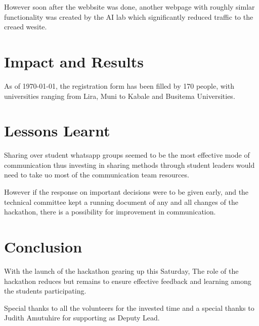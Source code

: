 \documentclass[a4paper,12pt]{report}
\begin{document}
    However soon after the webbsite was done, another webpage with roughly simlar functionality was created by the AI lab which significantly reduced traffic to the creaed wesite.

    \section{Impact and Results}
    As of \today , the registration form has been filled by 170 people, with universities ranging from Lira, Muni to Kabale and Busitema Universities.
    

    \section{Lessons Learnt}
    
    Sharing over student whatsapp groups seemed to be the most effective mode of communication thus investing in sharing methods through student leaders would need to take uo most of the communication team resources.
    
    However if the response on important decisions were to be given early, and the technical committee kept a running document of any and all changes of the hackathon, there is a possibility for improvement in communication.
    

    \section{Conclusion}
    With the launch of the hackathon gearing up this Saturday, The role of the hackathon reduces but remains to ensure effective feedback and learning among the students participating.

    Special thanks to all the volunteers for the invested time and a special thanks to Judith Amutuhire for supporting as Deputy Lead. 
\end{document}
